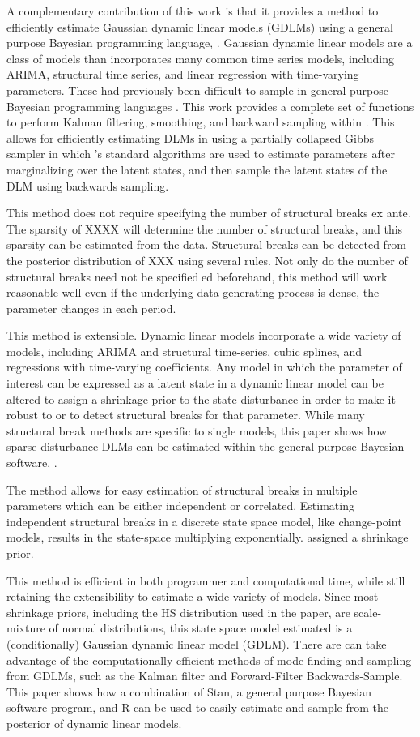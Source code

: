 A complementary contribution of this work is that it provides a method to efficiently estimate Gaussian dynamic linear models (GDLMs) using a general purpose Bayesian programming language, \Stan{}.
Gaussian dynamic linear models are a class of models than incorporates many common time series models, including ARIMA, structural time series, and linear regression with time-varying parameters.
These had previously been difficult to sample in general purpose Bayesian programming languages \parencite[477]{Jackman2009}.
This work provides a complete set of functions to perform Kalman filtering, smoothing, and backward sampling within \Stan{}.
This allows for efficiently estimating DLMs in \Stan{} using a partially collapsed Gibbs sampler in which \Stan{}'s standard algorithms are used to estimate parameters after marginalizing over the latent states, and then sample the latent states of the DLM using backwards sampling.


This method does not require specifying the number of structural breaks ex ante.
The sparsity of XXXX will determine the number of structural breaks, and this sparsity can be estimated from the data.
Structural breaks can be detected from the posterior distribution of XXX using several rules. Not only do
the number of structural breaks need not be specifieded beforehand, this method will work reasonable
well even if the underlying data-generating process is dense, \ie{}the parameter changes in each period.

This method is extensible. 
Dynamic linear models incorporate a wide variety of models, including ARIMA
and structural time-series, cubic splines, and regressions with time-varying coefficients. Any model in
which the parameter of interest can be expressed as a latent state in a dynamic linear model can be
altered to assign a shrinkage prior to the state disturbance in order to make it robust to or to detect
structural breaks for that parameter. While many structural break methods are specific to single
models, this paper shows how sparse-disturbance DLMs can be estimated within the general purpose
Bayesian software, \Stan{}.

The method allows for easy estimation of structural breaks in multiple parameters which can be either
independent or correlated. Estimating independent structural breaks in a discrete state space model,
like change-point models, results in the state-space multiplying exponentially.
assigned a shrinkage prior.

This method is efficient in both programmer and computational time, while still retaining the extensibility
to estimate a wide variety of models. Since most shrinkage priors, including the HS distribution
used in the paper, are scale-mixture of normal distributions, this state space model estimated is a
(conditionally) Gaussian dynamic linear model (GDLM). There are can take advantage of the computationally
efficient methods of mode finding and sampling from GDLMs, such as the Kalman filter and
Forward-Filter Backwards-Sample. This paper shows how a combination of Stan, a general purpose
Bayesian software program, and R can be used to easily estimate and sample from the posterior of
dynamic linear models.

